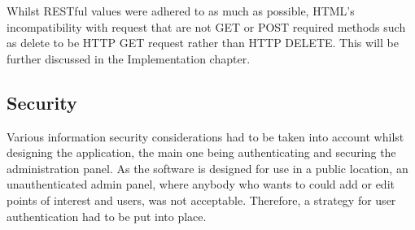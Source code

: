\begin{table}[H]
\centering
{}
\caption{API endpoints for /poi}
\label{tab:poi-endpoints}
\end{table}

Whilst RESTful values were adhered to as much as possible, HTML's incompatibility with request that are not GET or POST required methods such as delete to be HTTP GET request rather than HTTP DELETE. This will be further discussed in the Implementation chapter.


\subsection{Security}
\label{springpassword}

Various information security considerations had to be taken into account whilst designing the application, the main one being authenticating and securing the administration panel. As the software is designed for use in a public location, an unauthenticated admin panel, where anybody who wants to could add or edit points of interest and users, was not acceptable. Therefore, a strategy for user authentication had to be put into place.

